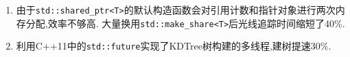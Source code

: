 \begin{enumerate}
\item 由于\verb|std::shared_ptr<T>|的默认构造函数会对引用计数和指针对象进行两次内存分配,效率不够高.
  大量换用\verb|std::make_share<T>|后光线追踪时间缩短了40\%.

  \item 利用C++11中的\verb|std::future|实现了KDTree树构建的多线程,建树提速30\%.



\end{enumerate}
